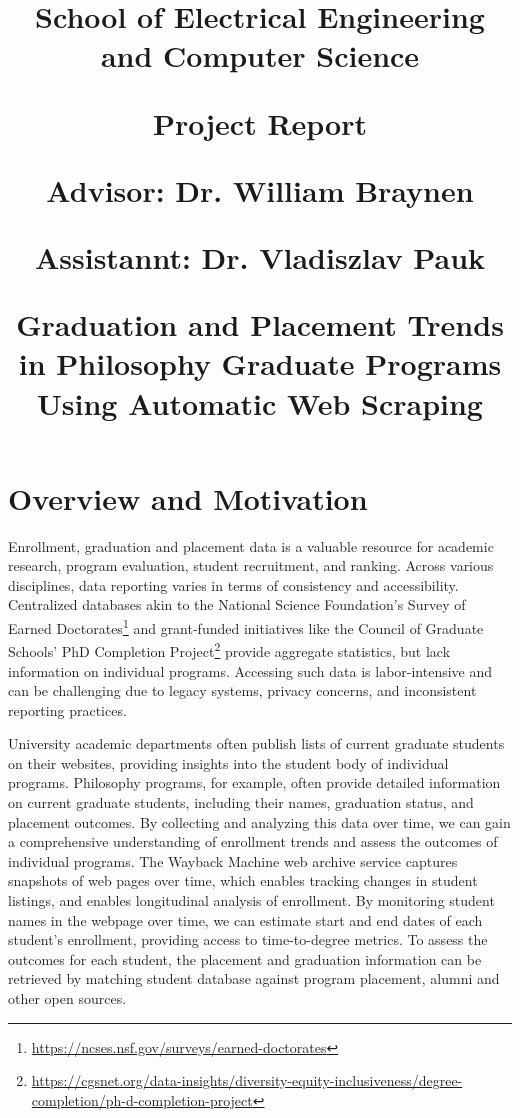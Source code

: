 \documentclass[11pt]{article}
\title{
    {\small School of Electrical Engineering and Computer Science}
    \vspace{0.5cm}

    {\small

    Project Report

    \vspace{1cm}

    Advisor: Dr. William Braynen

    Assistannt: Dr. Vladiszlav Pauk}
    \vspace{1cm}

    Graduation and Placement Trends in Philosophy Graduate Programs Using Automatic Web Scraping
    \date{}
}
\begin{document}
\maketitle
{}

\section{Overview and Motivation}


Enrollment, graduation and placement data is a valuable resource for academic research, program evaluation, student recruitment, and ranking.
Across various disciplines, data reporting varies in terms of consistency and accessibility.
Centralized databases akin to the National Science Foundation's Survey of Earned Doctorates\footnote{\url{https://ncses.nsf.gov/surveys/earned-doctorates}} and grant-funded initiatives like the Council of Graduate Schools' PhD Completion Project\footnote{\url{https://cgsnet.org/data-insights/diversity-equity-inclusiveness/degree-completion/ph-d-completion-project}} provide aggregate statistics, but lack information on individual programs.
Accessing such data is labor-intensive and can be challenging due to legacy systems, privacy concerns, and inconsistent reporting practices.

University academic departments often publish lists of current graduate students on their websites, providing insights into the student body of individual programs.
Philosophy programs, for example, often provide detailed information on current graduate students, including their names, graduation status, and placement outcomes.
By collecting and analyzing this data over time, we can gain a comprehensive understanding of enrollment trends and assess the outcomes of individual programs.
%
The Wayback Machine web archive service captures snapshots of web pages over time, which enables tracking changes in student listings, and enables longitudinal analysis of enrollment.
By monitoring student names in the webpage over time, we can estimate start and end dates of each student's enrollment, providing access to time-to-degree metrics.
To assess the outcomes for each student, the placement and graduation information can be retrieved by matching student database against program placement, alumni and other open sources.
\end{document}
